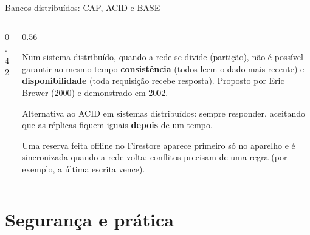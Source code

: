 \documentclass[aspectratio=169,10pt]{beamer}
\begin{document}
\begin{frame}{Bancos distribuídos: CAP, ACID e BASE}
  \begin{columns}[c]
    \begin{column}{0.42\textwidth}
      \centering
    \end{column}
    \begin{column}{0.56\textwidth}
      \begin{definicao}
        Num sistema distribuído, quando a rede se divide (partição), não é possível garantir ao mesmo tempo \textbf{consistência} (todos leem o dado mais recente) e \textbf{disponibilidade} (toda requisição recebe resposta). Proposto por Eric Brewer (2000) e demonstrado em 2002.
      \end{definicao}
      \begin{definicao}
        Alternativa ao ACID em sistemas distribuídos: sempre responder, aceitando que as réplicas fiquem iguais \textbf{depois} de um tempo.
      \end{definicao}
      \begin{exemplo}[No LabMonitor]
        Uma reserva feita offline no Firestore aparece primeiro só no aparelho e é sincronizada quando a rede volta; conflitos precisam de uma regra (por exemplo, a última escrita vence).
      \end{exemplo}
    \end{column}
  \end{columns}
\end{frame}

\section{Segurança e prática}
\end{document}
